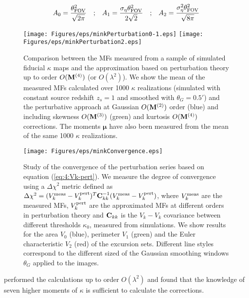 \begin{equation}
\label{eq:4:amplitude}
\begin{matrix}
\displaystyle A_0 = \frac{\theta_{\rm FOV}^2}{\sqrt{2\pi}} & ; & \displaystyle A_1 = \frac{\sigma_\eta\theta_{\rm FOV}^2}{2\sqrt{2}} & ; & \displaystyle A_2 = \frac{\sigma_\eta^2\theta^2_{\rm FOV}}{\sqrt{8\pi}}
\end{matrix}
\end{equation}
%
\begin{figure}
\begin{center}
\texttt{[image: Figures/eps/minkPerturbation0-1.eps]}
\texttt{[image: Figures/eps/minkPerturbation2.eps]}
\end{center}
\caption{Comparison between the MFs measured from a sample of simulated fiducial $\kappa$ maps and the approximation based on perturbation theory up to order $O(\mathbf{M}^{(4)})$ (or $O(\lambda^2)$). We show the mean of the measured MFs calculated over 1000 $\kappa$ realizations (simulated with constant source redshift $z_s=1$ and smoothed with $\theta_G=0.5'$) and the perturbative approach at Gaussian $O(\mathbf{M}^{(2)})$ order (blue) and including skewness $O(\mathbf{M}^{(3)})$ (green) and kurtosis $O(\mathbf{M}^{(4)})$ corrections. The moments $\pmb{\mu}$ have also been measured from the mean of the same 1000 $\kappa$ realizations.}
\label{fig:4:minkpert}
\end{figure}
%
\begin{figure}
\begin{center}
\texttt{[image: Figures/eps/minkConvergence.eps]}
\end{center}
\caption{Study of the convergence of the perturbation series based on equation (\ref{eq:4:Vk-pert}). We measure the degree of convergence using a $\Delta\chi^2$ metric defined as $\Delta\chi^2=(V_k^{\rm meas}-V_k^{\rm pert})^T\mathbf{C}_{kk}^{-1}(V_k^{\rm meas}-V_k^{\rm pert})$, where $V_k^{\rm meas}$ are the measured MFs, $V_k^{\rm pert}$ are the approximated MFs at different orders in perturbation theory and $\mathbf{C}_{kk}$ is the $V_k-V_k$ covariance between different thresholds $\kappa_0$, measured from simulations. We show results for the area $V_0$ (blue), perimeter $V_1$ (green) and the Euler characteristic $V_2$ (red) of the excursion sets. Different line styles correspond to the different sized of the Gaussian smoothing windows $\theta_G$ applied to the images.}
\label{fig:4:minkconv}
\end{figure}
%
\citep{Munshi12} performed the calculations up to order $O(\lambda^2)$ and found that the knowledge of seven higher moments of $\kappa$ is sufficient to calculate the corrections. 

